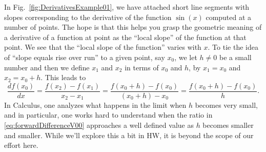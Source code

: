 In Fig.~\ref{fig:DerivativesExample01}, we have attached short line segments with slopes corresponding to the derivative of the function $\sin(x)$ computed at a number of points. The hope is that this helps you grasp the geometric meaning of a derivative of a function at point as the ``local slope'' of the function at that point.
 We see that the ``local slope of the function'' varies with $x$. To tie the idea of ``slope equals rise over run'' to a given point, say $x_0$, we let $h \neq 0$ be a small number and then we define $x_1$ and $x_2$ in terms of $x_0$ and $h$, by $x_1=x_0$ and $x_2=x_0 + h$. This leads to
 \begin{equation}
\label{eq:forwardDifferenceV00}
    \frac{ d f(x_0) }{d x}= \frac{f(x_2) - f(x_1)}{x_2 - x_1} =\frac{f(x_0 + h) - f(x_0)}{(x_0+h) - x_0} = \frac{f(x_0 + h) - f(x_0)}{h}.
\end{equation}
In Calculus, one analyzes what happens in the limit when $h$ becomes very small, and in particular, one works hard to understand when the ratio in \eqref{eq:forwardDifferenceV00} approaches a well defined value as $h$ becomes smaller and smaller. While we'll explore this a bit in HW, it is beyond the scope of our effort here. 
\vspace*{.2cm}

